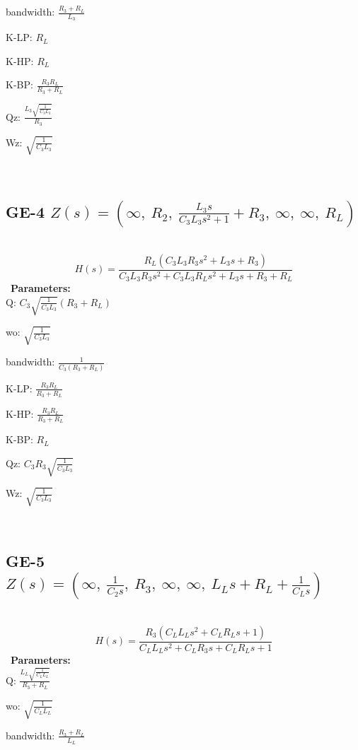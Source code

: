 \documentclass{article}
\begin{document}
bandwidth: $\frac{R_{3} + R_{L}}{L_{3}}$\ 

K-LP: $R_{L}$\ 

K-HP: $R_{L}$\ 

K-BP: $\frac{R_{3} R_{L}}{R_{3} + R_{L}}$\ 

Qz: $\frac{L_{3} \sqrt{\frac{1}{C_{3} L_{3}}}}{R_{3}}$\ 

Wz: $\sqrt{\frac{1}{C_{3} L_{3}}}$\ 

\ 

\subsection{GE-4 $Z(s) = \left( \infty, \  R_{2}, \  \frac{L_{3} s}{C_{3} L_{3} s^{2} + 1} + R_{3}, \  \infty, \  \infty, \  R_{L}\right)$ } \ 
\textbf{\[H(s) = \frac{R_{L} \left(C_{3} L_{3} R_{3} s^{2} + L_{3} s + R_{3}\right)}{C_{3} L_{3} R_{3} s^{2} + C_{3} L_{3} R_{L} s^{2} + L_{3} s + R_{3} + R_{L}}\] } \ 
\textbf{Parameters:}\\ 

Q: $C_{3} \sqrt{\frac{1}{C_{3} L_{3}}} \left(R_{3} + R_{L}\right)$\ 

wo: $\sqrt{\frac{1}{C_{3} L_{3}}}$\ 

bandwidth: $\frac{1}{C_{3} \left(R_{3} + R_{L}\right)}$\ 

K-LP: $\frac{R_{3} R_{L}}{R_{3} + R_{L}}$\ 

K-HP: $\frac{R_{3} R_{L}}{R_{3} + R_{L}}$\ 

K-BP: $R_{L}$\ 

Qz: $C_{3} R_{3} \sqrt{\frac{1}{C_{3} L_{3}}}$\ 

Wz: $\sqrt{\frac{1}{C_{3} L_{3}}}$\ 

\ 

\subsection{GE-5 $Z(s) = \left( \infty, \  \frac{1}{C_{2} s}, \  R_{3}, \  \infty, \  \infty, \  L_{L} s + R_{L} + \frac{1}{C_{L} s}\right)$ } \ 
\textbf{\[H(s) = \frac{R_{3} \left(C_{L} L_{L} s^{2} + C_{L} R_{L} s + 1\right)}{C_{L} L_{L} s^{2} + C_{L} R_{3} s + C_{L} R_{L} s + 1}\] } \ 
\textbf{Parameters:}\\ 

Q: $\frac{L_{L} \sqrt{\frac{1}{C_{L} L_{L}}}}{R_{3} + R_{L}}$\ 

wo: $\sqrt{\frac{1}{C_{L} L_{L}}}$\ 

bandwidth: $\frac{R_{3} + R_{L}}{L_{L}}$\ 
\end{document}
